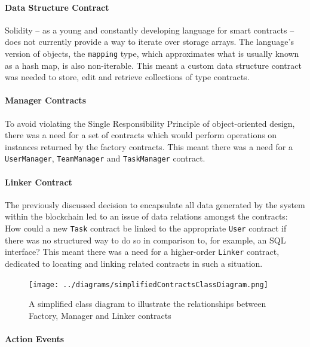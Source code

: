 \paragraph{Data Structure Contract}\label{data-structure-contract}

Solidity -- as a young and constantly developing language for smart
contracts -- does not currently provide a way to iterate over storage
arrays. The language's version of objects, the \texttt{mapping} type,
which approximates what is usually known as a hash map, is also
non-iterable. This meant a custom data structure contract was needed to
store, edit and retrieve collections of type contracts.

\paragraph{Manager Contracts}\label{manager-contracts}

To avoid violating the Single Responsibility
Principle\cite{martin2003agile} of object-oriented design, there was a
need for a set of contracts which would perform operations on instances
returned by the factory contracts. This meant there was a need for a
\texttt{UserManager}, \texttt{TeamManager} and \texttt{TaskManager}
contract.

\paragraph{Linker Contract}\label{linker-contract}

The previously discussed decision to encapsulate all data generated by
the system within the blockchain led to an issue of data relations
amongst the contracts: How could a new \texttt{Task} contract be linked
to the appropriate \texttt{User} contract if there was no structured way
to do so in comparison to, for example, an SQL interface? This meant
there was a need for a higher-order \texttt{Linker} contract, dedicated
to locating and linking related contracts in such a situation.

\begin{figure}[htbp]
\centering
\texttt{[image: ../diagrams/simplifiedContractsClassDiagram.png]}
\caption{A simplified class diagram to illustrate the relationships
between Factory, Manager and Linker contracts}
\end{figure}

\paragraph{Action Events}\label{action-events}

